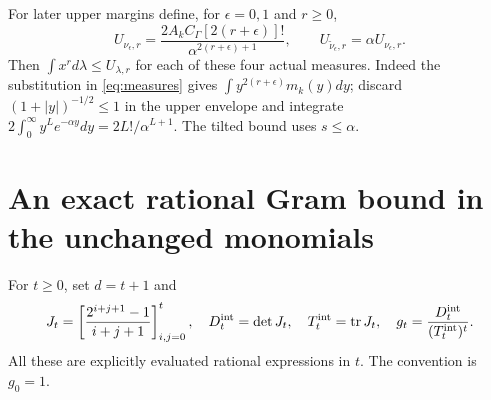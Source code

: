\documentclass[11pt]{article}
\newcommand{\tr}{\operatorname{tr}}
\begin{document}
For later upper margins define, for $\epsilon=0,1$ and $r\ge0$,
\begin{equation}\label{eq:momentcaps}
 U_{\nu_\epsilon,r}=
 \frac{2A_kC_\Gamma[2(r+\epsilon)]!}
 {\alpha^{2(r+\epsilon)+1}},\qquad
 U_{\widetilde\nu_\epsilon,r}=\alpha U_{\nu_\epsilon,r}.
\end{equation}
Then $\int x^r d\lambda\le U_{\lambda,r}$ for each of these
four actual measures. Indeed the substitution in
\eqref{eq:measures} gives $\int y^{2(r+\epsilon)}m_k(y)dy$;
discard $(1+|y|)^{-1/2}\le1$ in the upper envelope and integrate
$2\int_0^\infty y^Le^{-\alpha y}dy=2L!/\alpha^{L+1}$.
The tilted bound uses $s\le\alpha$.

\section{An exact rational Gram bound in the unchanged monomials}

For $t\ge0$, set $d=t+1$ and
\begin{equation}\label{eq:J}
 J_t=\left[\frac{2^{i+j+1}-1}{i+j+1}\right]_{i,j=0}^t,
 \quad D_t^{\rm int}=\det J_t,
 \quad T_t^{\rm int}=\tr J_t,
 \quad g_t=\frac{D_t^{\rm int}}{(T_t^{\rm int})^t}.
\end{equation}
All these are explicitly evaluated rational expressions in $t$.
The convention is $g_0=1$.
\end{document}
